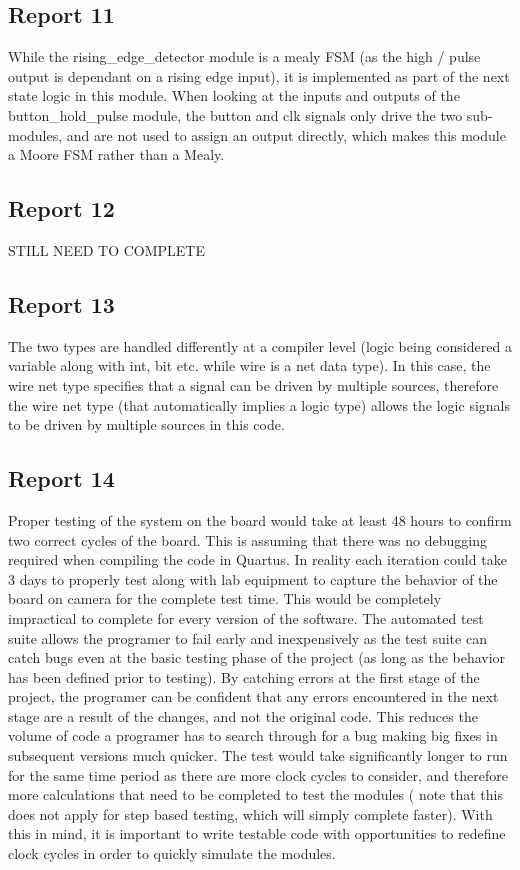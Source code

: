 \documentclass{report}
\begin{document}
\subsection{Report 11}
While the rising\_edge\_detector module is a mealy FSM (as the high / 
pulse output is dependant on a rising edge input), it is implemented as 
part of the next state logic in this module. When looking at the inputs and 
outputs of the button\_hold\_pulse module, the button and clk signals 
only drive the two sub-modules, and are not used to assign an output directly, 
which makes this module a Moore FSM rather than a Mealy.

\subsection{Report 12}
STILL NEED TO COMPLETE

\subsection{Report 13}
The two types are handled differently at a compiler level (logic 
being considered a variable along with int, bit etc. while wire is a net 
data type). In this case, the wire net type specifies that a signal can 
be driven by multiple sources, therefore the wire net type (that automatically 
implies a logic type) allows the logic signals to be driven by multiple 
sources in this code. 

\subsection{Report 14}
Proper testing of the system on the board would take at least 48 hours 
to confirm two correct cycles of the board. This is assuming that there 
was no debugging required when compiling the code in Quartus. In reality 
each iteration could take 3 days to properly test along with lab equipment 
to capture the behavior of the board on camera for the complete test 
time. This would be completely impractical to complete for every version 
of the software.
\break
\break
The automated test suite allows the programer to fail early and 
inexpensively as the test suite can catch bugs even at the basic 
testing phase of the project (as long as the behavior has been 
defined prior to testing). By catching errors at the first stage of the 
project, the programer can be confident that any errors encountered in 
the next stage are a result of the changes, and not the original code. 
This reduces the volume of code a programer has to search through for a 
bug making big fixes in subsequent versions much quicker.
\break
\break
The test would take significantly longer to run for the same time 
period as there are more clock cycles to consider, and therefore more 
calculations that need to be completed to test the modules ( note that 
this does not apply for step based testing, which will simply complete 
faster). With this in mind, it is important to write testable code with 
opportunities to redefine clock cycles in order to quickly simulate the 
modules.
\end{document}
